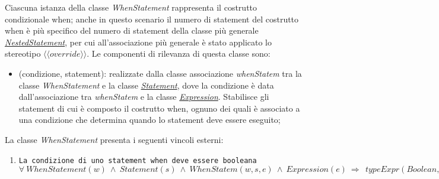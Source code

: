 
Ciascuna istanza della classe \textit{WhenStatement} rappresenta il costrutto condizionale when; anche in questo scenario il numero di statement del costrutto when è più specifico del numero di statement della classe più generale \hyperref[sec:modelstranslator:analysis:statements_analysis:statement:nestedstatement]{\textit{NestedStatement}}, per cui all'associazione più generale è stato applicato lo stereotipo $\langle\langle override \rangle\rangle$. Le componenti di rilevanza di questa classe sono:
\begin{itemize}
	\item (condizione, statement): realizzate dalla classe associazione \textit{whenStatem} tra la classe \textit{WhenStatement} e la classe \hyperref[sec:modelstranslator:analysis:statements_analysis:statement]{\textit{Statement}}, dove la condizione è data dall'associazione tra \textit{whenStatem} e la classe \hyperref[sec:modelstranslator:analysis:model_analysis:expression]{\textit{Expression}}. Stabilisce gli statement di cui è composto il costrutto when, ognuno dei quali è associato a una condizione che determina quando lo statement deve essere eseguito;
\end{itemize}

La classe \textit{WhenStatement} presenta i seguenti vincoli esterni:
\begin{enumerate}
	\item \texttt{La condizione di uno statement when deve essere booleana} \\
		  $\forall \ WhenStatement(w) \ \land \ Statement(s) \ \land \ WhenStatem(w, s, e) \ \land \ Expression(e) \ \Rightarrow \ \ typeExpr(Boolean, e)$ \\  
\end{enumerate}